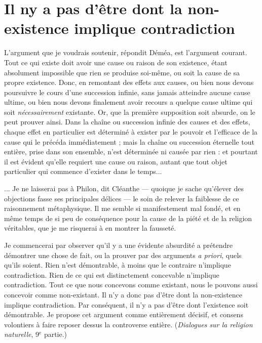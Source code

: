 
\section{ Il ny a pas d'être dont la non-existence implique contradiction}

L’argument que je voudrais soutenir, répondit Déméa,
est l’argument courant. Tout ce qui existe doit avoir
une cause ou raison de son existence, étant absolument
impossible que rien se produise soi-même, ou soit la cause
de sa propre existence. Donc, en remontant des effets aux
causes, ou bien nous devons poursuivre le cours d’une
succession infinie, sans jamais atteindre aucune cause
ultime, ou bien nous devons finalement avoir recours a
quelque cause ultime qui soit {\it nécessairement} existante. Or,
que la première supposition soit absurde, on le peut
prouver ainsi. Dans la chaîne ou succession infinie des
causes et des effets, chaque effet en particulier est déterminé
à exister par le pouvoir et l'efficace de la cause qui le
précéda immédiatement ; mais la chaîne ou succession
éternelle tout entière, prise dans son ensemble, n’est
déterminée ni causée par rien : et pourtant il est évident
qu’elle requiert une cause ou raison, autant que
tout objet particulier qui commence d’exister dans le
temps...

... Je ne laisserai pas à Philon, dit Cléanthe — quoique
je sache qu’élever des objections fasse ses principales
délices — le soin de relever la faiblesse de ce raisonnement
métaphysique. Il me semble si manifestement mal fondé,
et en même temps de si peu de conséquence pour la cause
de la piété et de la religion véritables, que je me risquerai
à en montrer la fausseté.

Je commencerai par observer qu’il y a une évidente
absurdité a prétendre démontrer une chose de fait,
ou la prouver par des arguments {\it a priori}, quels qu’ils
soient. Rien n’est démontrable, à moins que le contraire
n’implique contradiction. Rien de ce qui est distinctement
concevable n’implique contradiction. Tout ce que
nous concevons comme existant, nous le pouvons aussi
concevoir comme non-existant. Il n’y a donc pas d’être
dont la non-existence implique contradiction. Par conséquent,
il n’y a pas d’être dont l’existence soit démontrable.
Je propose cet argument comme entièrement
décisif, et consens volontiers à faire reposer dessus la
controverse entière. ({\it Dialogues sur la religion naturelle},
9$^\text{e}$ partie.)


